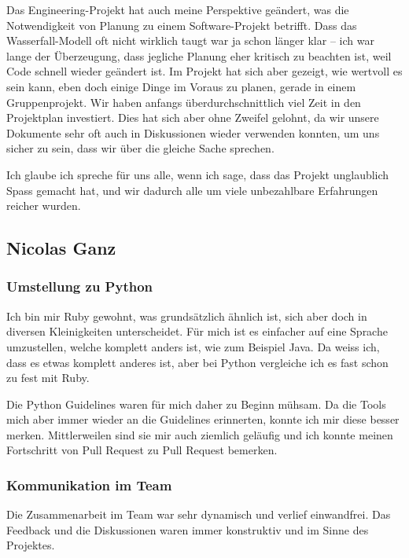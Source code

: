 \documentclass[a4paper]{article}
\begin{document}
Das Engineering-Projekt hat auch meine Perspektive geändert, was die
Notwendigkeit von Planung zu einem Software-Projekt betrifft. Dass das
Wasserfall-Modell oft nicht wirklich taugt war ja schon länger klar -- ich war
lange der Überzeugung, dass jegliche Planung eher kritisch zu beachten ist, weil
Code schnell wieder geändert ist. Im Projekt hat sich aber gezeigt, wie wertvoll
es sein kann, eben doch einige Dinge im Voraus zu planen, gerade in einem
Gruppenprojekt. Wir haben anfangs überdurchschnittlich viel Zeit in den
Projektplan investiert. Dies hat sich aber ohne Zweifel gelohnt, da wir unsere
Dokumente sehr oft auch in Diskussionen wieder verwenden konnten, um uns sicher
zu sein, dass wir über die gleiche Sache sprechen.

Ich glaube ich spreche für uns alle, wenn ich sage, dass das Projekt
unglaublich Spass gemacht hat, und wir dadurch alle um viele unbezahlbare
Erfahrungen reicher wurden.

\pagebreak

\subsection{Nicolas Ganz}

\subsubsection{Umstellung zu Python}

Ich bin mir Ruby gewohnt, was grundsätzlich ähnlich ist, sich aber doch in diversen Kleinigkeiten unterscheidet.
Für mich ist es einfacher auf eine Sprache umzustellen, welche komplett anders ist, wie zum Beispiel Java.
Da weiss ich, dass es etwas komplett anderes ist, aber bei Python vergleiche ich es fast schon zu fest mit Ruby.

Die Python Guidelines waren für mich daher zu Beginn mühsam.
Da die Tools mich aber immer wieder an die Guidelines erinnerten, konnte ich mir diese besser merken.
Mittlerweilen sind sie mir auch ziemlich geläufig und ich konnte meinen Fortschritt von Pull Request zu Pull Request bemerken.

\subsubsection{Kommunikation im Team}

Die Zusammenarbeit im Team war sehr dynamisch und verlief einwandfrei.
Das Feedback und die Diskussionen waren immer konstruktiv und im Sinne des Projektes.
\end{document}
